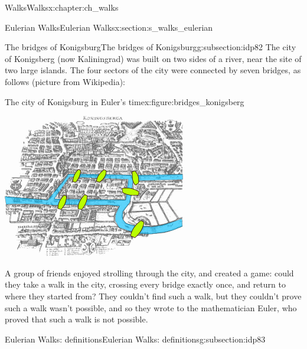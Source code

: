 \documentclass[oneside,10pt,]{book}
\numberwithin{equation}{section}
\begin{document}
\begin{chapterptx}{Walks}{}{Walks}{}{}{x:chapter:ch_walks}
\begin{sectionptx}{Eulerian Walks}{}{Eulerian Walks}{}{}{x:section:s_walks_eulerian}
%
%
\typeout{************************************************}
\typeout{************************************************}
%
\begin{subsectionptx}{The bridges of Konigsburg}{}{The bridges of Konigsburg}{}{}{g:subsection:idp82}
The city of Konigsberg (now Kaliningrad) was built on two sides of a river, near the site of two large islands.   The four sectors of the city were connected by seven bridges, as follows (picture from Wikipedia):%
\begin{figureptx}{The city of Konigsburg in Euler's time}{x:figure:bridges_konigsberg}{}%
\begin{image}{0.15}{0.7}{0.15}%
\includegraphics[width=\linewidth]{images/Konigsberg_bridges.png}
\end{image}%
\tcblower
\end{figureptx}%
A group of friends enjoyed strolling through the city, and created a game: could they take a walk in the city, crossing every bridge exactly once, and return to where they started from? They couldn't find such a walk, but they couldn't prove such a walk wasn't possible, and so they wrote to the mathematician Euler, who proved that such a walk is not possible.%
\end{subsectionptx}
%
%
\typeout{************************************************}
\typeout{************************************************}
%
\begin{subsectionptx}{Eulerian Walks: definitions}{}{Eulerian Walks: definitions}{}{}{g:subsection:idp83}

\end{subsectionptx}
\end{sectionptx}
\end{chapterptx}
\end{document}
